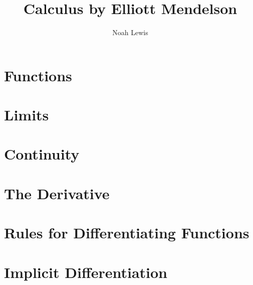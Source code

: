 \documentclass[10pt]{article}  %
\title{Calculus by Elliott Mendelson}
\author{Noah Lewis}
\begin{document}
\maketitle

\tableofcontents


\section{Functions}


\section{Limits}


\section{Continuity}


\section{The Derivative}


\section{Rules for Differentiating Functions}


\section{Implicit Differentiation}

\end{document}
